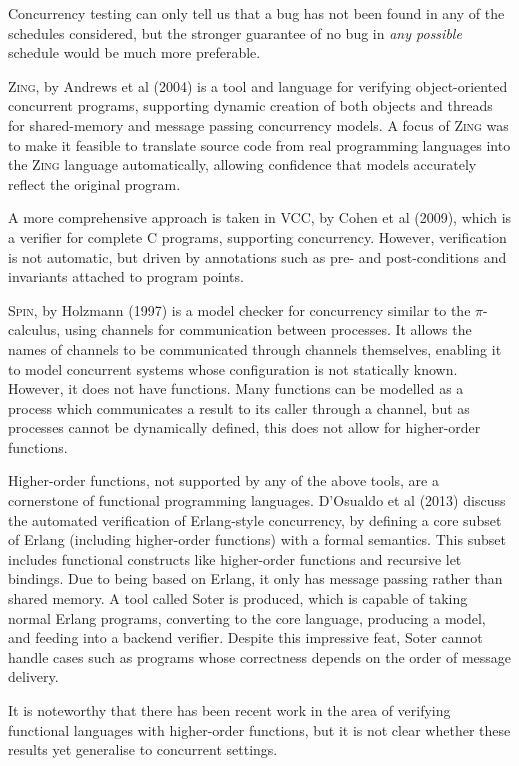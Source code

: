 Concurrency testing can only tell us that a bug has not been found in
any of the schedules considered, but the stronger guarantee of no bug
in \textit{any possible} schedule would be much more preferable.

\textsc{Zing}, by Andrews et al (2004)\nocite{zing} is a tool and
language for verifying object-oriented concurrent programs, supporting
dynamic creation of both objects and threads for shared-memory and
message passing concurrency models. A focus of \textsc{Zing} was to
make it feasible to translate source code from real programming
languages into the \textsc{Zing} language automatically, allowing
confidence that models accurately reflect the original program.

A more comprehensive approach is taken in VCC, by Cohen et al
(2009)\nocite{vcc}, which is a verifier for complete C programs,
supporting concurrency. However, verification is not automatic, but
driven by annotations such as pre- and post-conditions and invariants
attached to program points.

\textsc{Spin}, by Holzmann (1997)\nocite{spin} is a model checker for
concurrency similar to the $\pi$-calculus, using channels for
communication between processes. It allows the names of channels to be
communicated through channels themselves, enabling it to model
concurrent systems whose configuration is not statically
known. However, it does not have functions. Many functions can be
modelled as a process which communicates a result to its caller
through a channel, but as processes cannot be dynamically defined,
this does not allow for higher-order functions.

Higher-order functions, not supported by any of the above tools, are a
cornerstone of functional programming languages. D'Osualdo et al
(2013)\nocite{erlang} discuss the automated verification of
Erlang-style concurrency, by defining a core subset of Erlang
(including higher-order functions) with a formal semantics. This
subset includes functional constructs like higher-order functions and
recursive let bindings. Due to being based on Erlang, it only has
message passing rather than shared memory. A tool called Soter is
produced, which is capable of taking normal Erlang programs,
converting to the core language, producing a model, and feeding into a
backend verifier. Despite this impressive feat, Soter cannot handle
cases such as programs whose correctness depends on the order of
message delivery.

It is noteworthy that there has been recent work in the area of
verifying functional languages with higher-order
functions\cite{travmc2}, but it is not clear whether these results yet
generalise to concurrent settings.

